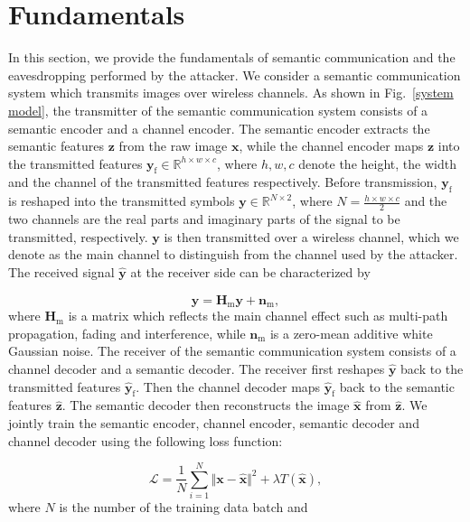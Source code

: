 \documentclass[conference]{IEEEtran}
\begin{document}
\section{Fundamentals}
\label{sec fundamentals}
In this section, we provide the fundamentals of semantic communication and the eavesdropping performed by the attacker. We consider a semantic communication system which transmits images over wireless channels. As shown in Fig.~\ref{system model}, the transmitter of the semantic communication system consists of a semantic encoder and a channel encoder. The semantic encoder extracts the semantic features $\boldsymbol{z}$ from the raw image $\boldsymbol{x}$, while the channel encoder maps $\boldsymbol{z}$ into the transmitted features $\boldsymbol{y}_\mathrm{f} \in \mathbb{R}^{h \times w \times c}$, where $h, w, c$ denote the height, the width and the channel of the transmitted features respectively. Before transmission, $\boldsymbol{y}_\mathrm{f}$ is reshaped into the transmitted symbols $\boldsymbol{y} \in \mathbb{R}^{N \times 2}$, where $N = \frac{h \times w \times c}{2}$ and the two channels are the real parts and imaginary parts of the signal to be transmitted, respectively. $\boldsymbol{y}$ is then transmitted over a wireless channel, which we denote as the main channel to distinguish from the channel used by the attacker. The received signal $\hat{\boldsymbol{y}}$ at the receiver side can be characterized by 

\begin{equation}
	\hat{\boldsymbol{y}} = \boldsymbol{H}_\mathrm{m}\boldsymbol{y} + \boldsymbol{n}_\mathrm{m},
\end{equation}
where $\boldsymbol{H}_\mathrm{m}$ is a matrix which reflects the main channel effect such as multi-path propagation, fading and interference, while $\boldsymbol{n}_\mathrm{m}$ is a zero-mean additive white Gaussian noise. The receiver of the semantic communication system consists of a channel decoder and a semantic decoder. The receiver first reshapes $\hat{\boldsymbol{y}}$ back to the transmitted features $\hat{\boldsymbol{y}}_\mathrm{f}$. Then the channel decoder maps $\hat{\boldsymbol{y}}_\mathrm{f}$ back to the semantic features $\hat{\boldsymbol{z}}$. The semantic decoder then reconstructs the image $\hat{\boldsymbol{x}}$ from $\hat{\boldsymbol{z}}$. We jointly train the semantic encoder, channel encoder, semantic decoder and channel decoder using the following loss function: 

\begin{equation}
\label{ae loss}
	\mathcal{L} = \frac{1}{N}\sum\limits_{i=1}^N \Vert \boldsymbol{x} - \hat{\boldsymbol{x}} \Vert^2 + \lambda T(\hat{\boldsymbol{x}}),
\end{equation}
where $N$ is the number of the training data batch and 
\end{document}
